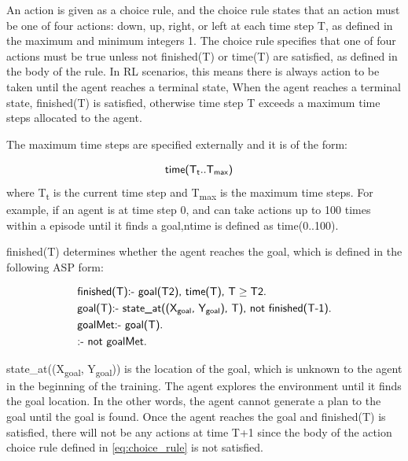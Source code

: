 An action is given as a choice rule, and the choice rule states that an action must be one of four actions: \textsf{down}, \textsf{up}, \textsf{right}, or \textsf{left}
at each time step T, as defined in the maximum and minimum integers 1.
The choice rule specifies that one of four actions must be true unless \textsf{not finished(T)} or \textsf{time(T)} are satisfied, as defined in the body of the rule.
In RL scenarios, this means there is always action to be taken until the agent reaches a terminal state, 
When the agent reaches a terminal state, \textsf{finished(T)} is satisfied, otherwise time step T exceeds a maximum time steps allocated to the agent.

The maximum time steps are specified externally and it is of the form:

\begin{equation}
\begin{split}
&\textsf{time(T\textsubscript{t}..T\textsubscript{max})}
\end{split}
\end{equation}
where T\textsubscript{t} is the current time step and T\textsubscript{max} is the maximum time steps.
For example, if an agent is at time step 0, and can take actions up to 100 times within a episode until it finds a goal,ntime is defined as \textsf{time(0..100)}.

\textsf{finished(T)} determines whether the agent reaches the goal, which is defined in the following ASP form:

\begin{equation}\label{eq:asp_goal}
\begin{split}
&\textsf{finished(T):- goal(T2), time(T), T} \geq \textsf{T2.}\\
&\textsf{goal(T):- state\_at((X\textsubscript{goal}, Y\textsubscript{goal}), T), not finished(T-1).}\\
&\textsf{goalMet:- goal(T).}\\
&\textsf{:- not goalMet.}
\end{split}
\end{equation}

\textsf{state\_at((X\textsubscript{goal}, Y\textsubscript{goal}))} is the location of the goal, which is unknown to the agent in the beginning of the training.
The agent explores the environment until it finds the goal location.
In the other words, the agent cannot generate a plan to the goal until the goal is found. 
Once the agent reaches the goal and \textsf{finished(T)} is satisfied, 
there will not be any actions at time T+1 since the body of the action choice rule defined in \ref{eq:choice_rule} is not satisfied.

